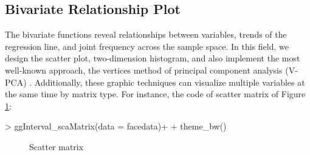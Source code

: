 \documentclass[article]{jss}
\begin{document}

\subsection{Bivariate Relationship Plot}

The bivariate functions reveal relationships between variables, trends of the regression line, and joint frequency across the sample space. In this field, we design the scatter plot, two-dimension histogram, and also implement the most well-known approach, the vertices method of principal component analysis (V-PCA) \cite{cazes1997extension}. Additionally, these graphic techniques can visualize multiple variables at the same time by matrix type. For instance, the code of scatter matrix of Figure \ref{fig:scaMatrix}:

\begin{Schunk}
\begin{Sinput}
> ggInterval_scaMatrix(data = facedata)+
+   theme_bw()
\end{Sinput}
\end{Schunk}

\begin{figure}[htbp]
\centering
{}
\caption{\label{fig:scaMatrix} Scatter matrix}
\end{figure}
\end{document}
